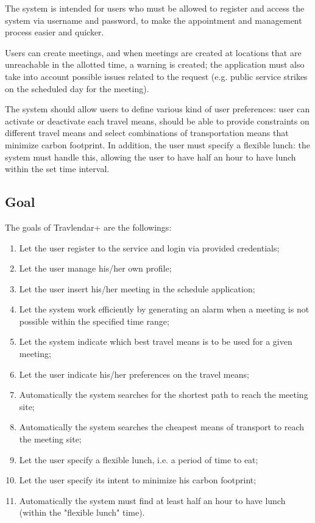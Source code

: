 \documentclass{article}
\begin{document}
	\bigskip
	The system is intended for users who must be allowed to register and access the system via username and password, to make the appointment and management process easier and quicker.

	Users can create meetings, and when meetings are created at locations that are unreachable in the allotted time, a warning is created; the application must also take into account possible issues related to the request (e.g. public service strikes on the scheduled day for the meeting). 
	
	\bigskip
	The system should allow users to define various kind of user preferences: user can activate or deactivate each travel means, should be able to provide constraints on different travel means and select combinations of transportation means that minimize carbon footprint. In addition, the user must specify a flexible lunch: the system must handle this, allowing the user to have half an hour to have lunch within the set time interval.
	
	
	\subsection{Goal}
	The goals of Travlendar+ are the followings:

	\begin{enumerate}
		\item Let the user register to the service and login via provided credentials;
		\item Let the user manage his/her own profile;
		\item Let the user insert his/her meeting in the schedule application;
		\item Let the system work efficiently by generating an alarm when a meeting is not possible within the specified time range;
		\item Let the system indicate which best travel means is to be used for a given meeting;
		\item Let the user indicate his/her preferences on the travel means;
		\item Automatically the system searches for the shortest path to reach the meeting site;
		\item Automatically the system searches the cheapest means of transport to reach the meeting site;
		\item Let the user specify a flexible lunch, i.e. a period of time to eat;
		\item Let the user specify its intent to minimize his carbon footprint;
		\item Automatically the system must find at least half an hour to have lunch (within the "flexible lunch" time).
	\end{enumerate}
\end{document}
